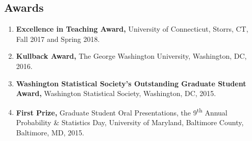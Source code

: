 \documentclass{res}
\begin{document}
\begin{resume}
\section{Awards}
\begin{enumerate}
	\item {\bf Excellence in Teaching Award,} University of Connecticut, Storrs, CT, Fall 2017 and Spring 2018.
	\item {\bf Kullback Award,} The George Washington University, Washington, DC, 2016.
	\item {\bf Washington Statistical Society's Outstanding Graduate Student Award,} Washington Statistical Society, Washington, DC, 2015.
	\item {\bf First Prize,} Graduate Student Oral Presentations, the 9\textsuperscript{th} Annual Probability \& Statistics Day,  University of Maryland, Baltimore County, Baltimore, MD, 2015.
\end{enumerate}
\end{resume} 
\end{document}
